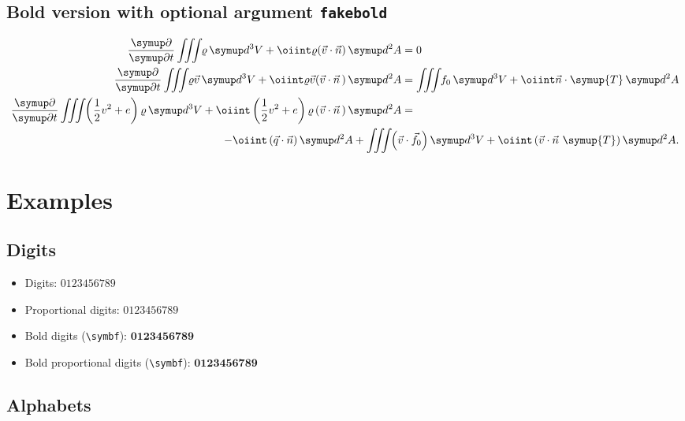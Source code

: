 \documentclass[english,log-declarations=false]{article}
\begin{document}
\subsection{Bold version with optional argument \texttt{fakebold}}


\setBold
\begin{align}
 \Q{}{t}\iiint\<\varrho\diff^3V+\oiint\varrho(\vec{v}\cdot\vec{n})\diff^2A          &= 0\\
 \Q{}{t}\iiint\<\varrho\vec{v}\diff^3V+\oiint\varrho\vec{v}(\vec{v}\cdot\vec{n}\,)\diff^2A &=
        \iiint\<f_0\diff^3V+\oiint\vec{n}\cdot\symup{T}\diff^2A \\
 \Q{}{t}\iiint\<\left(\half v^2+e\right)\varrho\diff^3V+\oiint\left(\half v^2+e\right)
        \varrho\left(\vec{v}\cdot\vec{n}\,\right)\diff^2A                                & =\\
 \multispan2{\hfill${\displaystyle-\oiint\left(\vec{q}\cdot\vec{n}\right)\diff^2A+
         \iiint\<\left(\vec{v}\cdot\vec{f}_0\right)\diff^3V+\oiint\left(\vec{v}
         \cdot\vec{n}~\symup{T}\right)\diff^2A}$}.\nonumber
\end{align}
\unsetBold


\fi


\section{Examples}

\subsection{Digits}

\begin{itemize}
  \item Digits: \hfill $ 0123456789 $
  \item Proportional digits: \hfill\begingroup{} $ 0123456789 $ \endgroup
  \item Bold digits (\verb|\symbf|): \hfill $ \symbf{0123456789} $
  \item Bold proportional digits (\verb|\symbf|): \hfill \begingroup{}$\symbf{0123456789}$\endgroup
\end{itemize}

\subsection{Alphabets}
\end{document}

